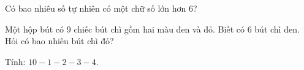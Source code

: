 \begin{ex} %
Có bao nhiêu số tự nhiên có một chữ số lớn hơn 6?
\end{ex}

\begin{ex} %
Một hộp bút có 9 chiếc bút chì gồm hai màu đen và đỏ. Biết có 6 bút chì đen. Hỏi có bao nhiêu bút chì đỏ?
\end{ex}

\begin{ex} %
Tính: $10 - 1 - 2 - 3 - 4$.
\end{ex}
